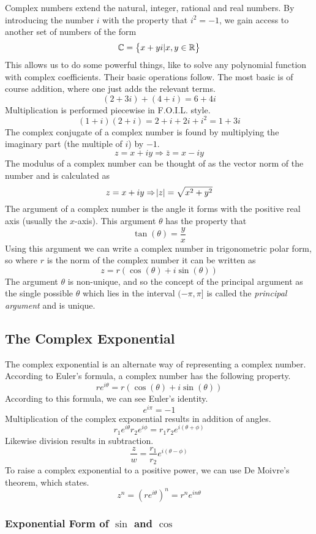\documentclass[12pt]{report}
\begin{document}
\begin{flushleft}
Complex numbers extend the natural, integer, rational and real numbers. By 
introducing the number \(i\) with the property that \(i^2 = -1\), we gain
access to another set of numbers of the form
\[\mathbb{C} = \set{x + yi | x, y \in \mathbb{R}}\]
This allows us to do some powerful things, like to solve any polynomial
function with complex coefficients. Their basic operations follow. The most
basic is of course addition, where one just adds the relevant terms.
\[(2 + 3i) + (4 + i) = 6 + 4i\]
Multiplication is performed piecewise in F.O.I.L. style.
\[(1 + i)(2 + i) = 2 + i + 2i + i^2 = 1 + 3i\]
The complex conjugate of a complex number is found by multiplying the imaginary
part (the multiple of \(i\)) by \(-1\).
\[z = x + iy \Rightarrow \bar{z} = x - iy\]
The modulus of a complex number can be thought of as the vector norm of the
number and is calculated as
\[z = x + iy \Rightarrow \abs{z} = \sqrt{x^2 + y^2}\]
The argument of a complex number is the angle it forms with the positive real
axis (usually the \(x\)-axis). This argument \(\theta\) has the property that
\[\tan(\theta) = \frac{y}{x}\]
Using this argument we can write a complex number in trigonometric polar form,
so where \(r\) is the norm of the complex number it can be written as
\[z = r(\cos(\theta) + i\sin(\theta))\]
The argument \(\theta\) is non-unique, and so the concept of the principal 
argument as the single possible \(\theta\) which lies in the interval 
\((-\pi, \pi]\) is called the \textit{principal argument} and is unique.

\subsection*{The Complex Exponential}

The complex exponential is an alternate way of representing a complex number.
According to Euler's formula, a complex number has the following property.
\[re^{i\theta} = r(\cos(\theta) + i\sin(\theta))\]
According to this formula, we can see Euler's identity.
\[e^{i\pi} = -1\]
Multiplication of the complex exponential results in addition of angles.
\[r_1e^{i\theta}r_2e^{i\phi} = r_1r_2e^{i(\theta + \phi)}\]
Likewise division results in subtraction.
\[\frac{z}{w} = \frac{r_1}{r_2}e^{i(\theta - \phi)}\]
To raise a complex exponential to a positive power, we can use De Moivre's
theorem, which states.
\[z^n = \left(re^{i\theta}\right)^n = r^ne^{in\theta}\]

\subsubsection*{Exponential Form of \(\sin\) and \(\cos\)}


\end{flushleft}
\end{document}
